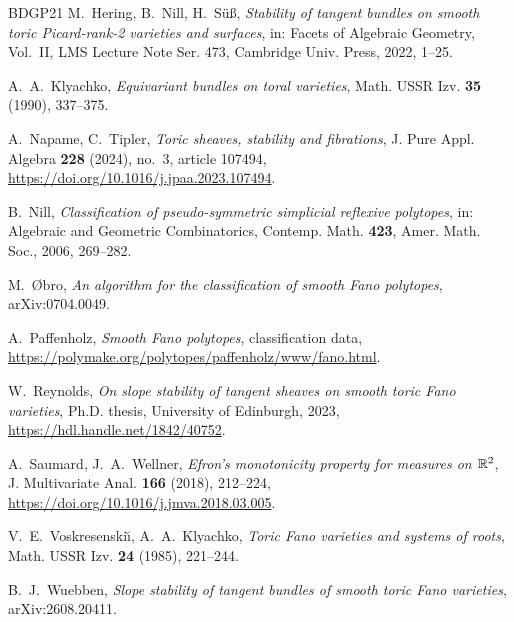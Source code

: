 \begin{thebibliography}{BDGP21}
 M.~Hering, B.~Nill, H.~S\"u\ss, \emph{Stability of tangent
bundles on smooth toric Picard-rank-2 varieties and surfaces}, in: Facets of Algebraic Geometry,
Vol.~II, LMS Lecture Note Ser. 473, Cambridge Univ. Press, 2022, 1--25.

 A.~A.~Klyachko, \emph{Equivariant bundles on toral varieties},
Math. USSR Izv. \textbf{35} (1990), 337--375.

 A.~Napame, C.~Tipler, \emph{Toric
sheaves, stability and fibrations}, J. Pure Appl. Algebra \textbf{228}
(2024), no.~3, article 107494,
\url{https://doi.org/10.1016/j.jpaa.2023.107494}.

 B.~Nill, \emph{Classification of pseudo-symmetric simplicial reflexive
polytopes}, in: Algebraic and Geometric Combinatorics, Contemp. Math. \textbf{423}, Amer. Math.
Soc., 2006, 269--282.

 M.~\O bro, \emph{An algorithm for the classification of smooth Fano
polytopes}, arXiv:0704.0049.

 A.~Paffenholz, \emph{Smooth Fano polytopes}, classification data,
\url{https://polymake.org/polytopes/paffenholz/www/fano.html}.

 W.~Reynolds, \emph{On slope stability of tangent
sheaves on smooth toric Fano varieties}, Ph.D. thesis, University of Edinburgh,
2023, \url{https://hdl.handle.net/1842/40752}.

 A.~Saumard, J.~A.~Wellner,
\emph{Efron's monotonicity property for measures on $\mathbb{R}^2$},
J. Multivariate Anal. \textbf{166} (2018), 212--224,
\url{https://doi.org/10.1016/j.jmva.2018.03.005}.

 V.~E.~Voskresenski\u{\i}, A.~A.~Klyachko, \emph{Toric
Fano varieties and systems of roots}, Math. USSR Izv. \textbf{24} (1985), 221--244.

 B.~J.~Wuebben, \emph{Slope stability of tangent bundles of smooth
toric Fano varieties}, arXiv:2608.20411.

\end{thebibliography}
